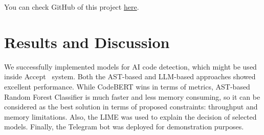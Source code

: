 \documentclass{article}
\begin{document}
You can check GitHub of this project \href{https://github.com/dsomni/ml-s25}{here}.

\section{Results and Discussion}

We successfully implemented models for AI code detection, which might be used inside Accept~\cite{Beresnev} system. Both the AST-based and LLM-based approaches showed excellent performance. While CodeBERT wins in terms of metrics, AST-based Random Forest Classifier is much faster and less memory consuming, so it can be considered as the best solution in terms of proposed constraints: throughput and memory limitations. Also, the LIME was used to explain the decision of selected models. Finally, the Telegram bot was deployed for demonstration purposes.



\end{document}

